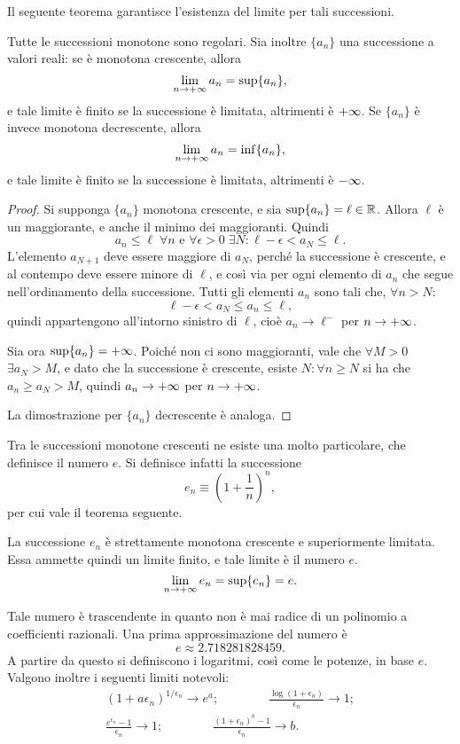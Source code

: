 Il seguente teorema garantisce l'esistenza del limite per tali successioni.
\begin{teorema}
Tutte le successioni monotone sono regolari. Sia inoltre $\{a_n\}$ una successione a valori reali: se è monotona crescente, allora
\[
\lim_{n\to +\infty} a_n=\sup\{a_n\},
\]
e tale limite è finito se la successione è limitata, altrimenti è $+\infty$.
Se $\{a_n\}$ è invece monotona decrescente, allora
\[
\lim_{n\to +\infty} a_n=\inf\{a_n\},
\]
e tale limite è finito se la successione è limitata, altrimenti è $-\infty$.
\end{teorema}
\begin{proof}
Si supponga $\{a_n\}$ monotona crescente, e sia $\sup\{a_n\}=\ell\in\mathbb{R}$. Allora $\ell$ è un maggiorante, e anche il minimo dei maggioranti. Quindi
\[
a_n\leq\ell\;\forall n\text{ e }\forall\epsilon>0\;\exists N\colon\ell-\epsilon<a_N\leq\ell.
\]
L'elemento $a_{N+1}$ deve essere maggiore di $a_N$, perché la successione è crescente, e al contempo deve essere minore di $\ell$, e così via per ogni elemento di $a_n$ che segue nell'ordinamento della successione. Tutti gli elementi $a_n$ sono tali che, $\forall n>N$:
\[
\ell-\epsilon<a_N\leq a_n\leq\ell,
\]
quindi appartengono all'intorno sinistro di $\ell$, cioè $a_n\to\ell^-$ per $n\to +\infty$.

Sia ora $\sup\{a_n\}=+\infty$. Poiché non ci sono maggioranti, vale che $\forall M>0$ $\exists a_N>M$, e dato che la successione è crescente, esiste $N\colon\forall n\geq N$ si ha che $a_n\geq a_N>M$, quindi $a_n\to +\infty$ per $n\to +\infty$.

La dimostrazione per $\{a_n\}$ decrescente è analoga.
\end{proof}
Tra le successioni monotone crescenti ne esiste una molto particolare, che definisce il numero $e$. Si definisce infatti la successione
\[
e_n\equiv\left(1+\frac1{n}\right)^n,
\]
per cui vale il teorema seguente.
\begin{teorema}
La successione $e_n$ è strettamente monotona crescente e superiormente limitata. Essa ammette quindi un limite finito, e tale limite è il numero $e$.
\[
\lim_{n\to +\infty} e_n=\sup\{e_n\}=e.
\]
\end{teorema}
Tale numero è trascendente in quanto non è mai radice di un polinomio a coefficienti razionali. Una prima approssimazione del numero è
\[
e\approx\num{2.718281828459}.
\]
A partire da questo si definiscono i logaritmi, così come le potenze, in base $e$. Valgono inoltre i seguenti limiti notevoli:
\begin{gather*}
(1+a\epsilon_n)^{1/\epsilon_n}\to e^a;\qquad\qquad\frac{\log(1+\epsilon_n)}{\epsilon_n}\to 1;\\
\frac{e^{\epsilon_n}-1}{\epsilon_n}\to 1;\qquad\qquad\frac{(1+\epsilon_n)^b-1}{\epsilon_n}\to b.
\end{gather*}

